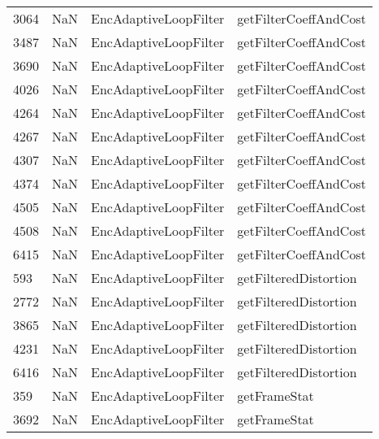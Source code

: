 \begin{tabular}{llll}
3064 &                   NaN &      EncAdaptiveLoopFilter &                     getFilterCoeffAndCost \\
3487 &                   NaN &      EncAdaptiveLoopFilter &                     getFilterCoeffAndCost \\
3690 &                   NaN &      EncAdaptiveLoopFilter &                     getFilterCoeffAndCost \\
4026 &                   NaN &      EncAdaptiveLoopFilter &                     getFilterCoeffAndCost \\
4264 &                   NaN &      EncAdaptiveLoopFilter &                     getFilterCoeffAndCost \\
4267 &                   NaN &      EncAdaptiveLoopFilter &                     getFilterCoeffAndCost \\
4307 &                   NaN &      EncAdaptiveLoopFilter &                     getFilterCoeffAndCost \\
4374 &                   NaN &      EncAdaptiveLoopFilter &                     getFilterCoeffAndCost \\
4505 &                   NaN &      EncAdaptiveLoopFilter &                     getFilterCoeffAndCost \\
4508 &                   NaN &      EncAdaptiveLoopFilter &                     getFilterCoeffAndCost \\
6415 &                   NaN &      EncAdaptiveLoopFilter &                     getFilterCoeffAndCost \\
593  &                   NaN &      EncAdaptiveLoopFilter &                     getFilteredDistortion \\
2772 &                   NaN &      EncAdaptiveLoopFilter &                     getFilteredDistortion \\
3865 &                   NaN &      EncAdaptiveLoopFilter &                     getFilteredDistortion \\
4231 &                   NaN &      EncAdaptiveLoopFilter &                     getFilteredDistortion \\
6416 &                   NaN &      EncAdaptiveLoopFilter &                     getFilteredDistortion \\
359  &                   NaN &      EncAdaptiveLoopFilter &                              getFrameStat \\
3692 &                   NaN &      EncAdaptiveLoopFilter &                              getFrameStat \\

\end{tabular}
